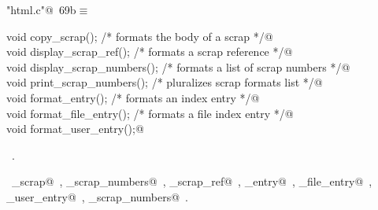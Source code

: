 \documentclass[a4paper]{report}
\begin{document}
\begin{flushleft} \small
\begin{minipage}{\linewidth}\label{scrap136}\raggedright\small
{} \verb@"html.c"@\nobreak\ {\footnotesize {69b}}$\equiv$
\vspace{-1ex}
\begin{list}{}{} \item
\mbox{}\verb@static void copy_scrap();               /* formats the body of a scrap */@\\
\mbox{}\verb@static void display_scrap_ref();        /* formats a scrap reference */@\\
\mbox{}\verb@static void display_scrap_numbers();    /* formats a list of scrap numbers */@\\
\mbox{}\verb@static void print_scrap_numbers();      /* pluralizes scrap formats list */@\\
\mbox{}\verb@static void format_entry();             /* formats an index entry */@\\
\mbox{}\verb@static void format_file_entry();        /* formats a file index entry */@\\
\mbox{}\verb@static void format_user_entry();@\\
\mbox{}\verb@@{\NWsep}
\end{list}
\vspace{-1.5ex}
\footnotesize
\begin{list}{}{\setlength{\itemsep}{-\parsep}\setlength{\itemindent}{-\leftmargin}}
\item \NWtxtFileDefBy\ .
\item \NWtxtIdentsUsed\nobreak\  \verb@copy_scrap@\nobreak\ , \verb@display_scrap_numbers@\nobreak\ , \verb@display_scrap_ref@\nobreak\ , \verb@format_entry@\nobreak\ , \verb@format_file_entry@\nobreak\ , \verb@format_user_entry@\nobreak\ , \verb@print_scrap_numbers@\nobreak\ .
\item{}
\end{list}
\end{minipage}\vspace{4ex}
\end{flushleft}
\end{document}
